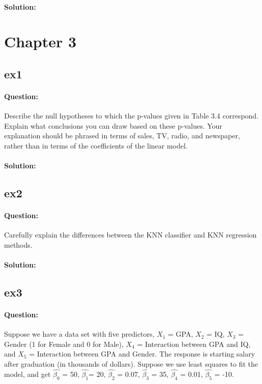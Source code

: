 \documentclass[a4paper,12pt,titlepage]{article} %
\begin{document}
\paragraph{Solution:}

\newpage
\section{Chapter 3}
\subsection{ex1}
\paragraph{Question:} Describe the null hypotheses to which the p-values given in Table 3.4 correspond. Explain what conclusions you can draw based on these p-values. Your explanation should be phrased in terms of sales, TV, radio, and newspaper, rather than in terms of the coefficients of the
linear model.

\paragraph{Solution:}

\subsection{ex2}
\paragraph{Question:} Carefully explain the differences between the KNN classifier and KNN
regression methods.

\paragraph{Solution:}

\subsection{ex3}
\paragraph{Question:} Suppose we have a data set with five predictors, $X_{1}$ = GPA, $X_{2}$ = IQ, $X_{3}$ = Gender (1 for Female and 0 for Male), $X_{4}$ = Interaction between GPA and IQ, and $X_{5}$ = Interaction between GPA and Gender. The response is starting salary after graduation (in thousands of dollars). Suppose we use least squares to fit the model, and get $\hat{\beta_{0}}$ = 50, $\hat{\beta_{1}}$= 20, $\hat{\beta_{2}}$ = 0.07, $\hat{\beta_{3}}$ = 35, $\hat{\beta_{4}}$ = 0.01, $\hat{\beta_{5}}$ = -10.
\end{document}
